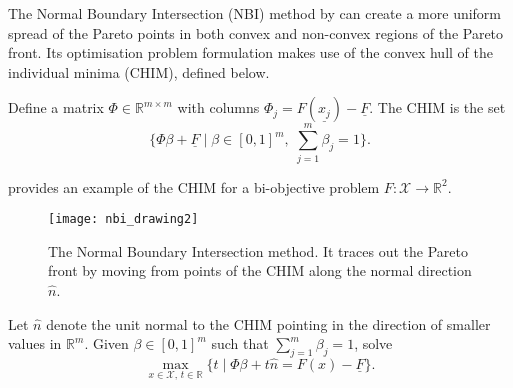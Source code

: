 \documentclass[main.tex]{subfiles}
\begin{document}
The Normal Boundary Intersection (NBI) method by \citet{das1998normal} can
create a more uniform spread of the Pareto points in both convex and
non-convex regions of the Pareto front. Its optimisation problem
formulation makes use of the convex hull of the individual minima
(CHIM), defined below.
\begin{mydef}
  Define a matrix $\Phi\in\mathbb{R}^{m\times m}$ with columns
  $\Phi_j = F(\underline{x_j})-\underline{F}$.
  The CHIM is the set
  \begin{equation}\textstyle
    \{\Phi\beta + \underline{F} \mid \beta\in{[0,1]}^m,\;\sum_{j=1}^m\beta_j = 1\}.
  \end{equation}
\end{mydef}

\begin{example}
   provides an example of the CHIM for a
  bi-objective problem $F:\mathcal{X}\to\mathbb{R}^2$.
  \begin{figure}[htbp]
    \centering
    \texttt{[image: nbi\_drawing2]}
    \caption[The Normal Boundary Intersection Method.]{The Normal Boundary Intersection method. It traces out the
      Pareto front by moving from points of the CHIM along the normal
      direction $\hat n$.}\label{fig:nbi_drawing2}
  \end{figure}
\end{example}

\begin{mydef}
  Let $\hat{n}$ denote the unit normal to the CHIM pointing in the
  direction of smaller values in $\mathbb{R}^m$.
  Given $\beta\in{[0,1]}^m$ such that
  $\sum_{j=1}^m\beta_j=1$, solve
  \begin{equation}
    \max_{x\in\mathcal{X},\,t\in\mathbb{R}} \{t \mid \Phi\beta +
    t\hat{n} = F(x) - \underline{F}\}.
  \end{equation}
\end{mydef}
\end{document}
